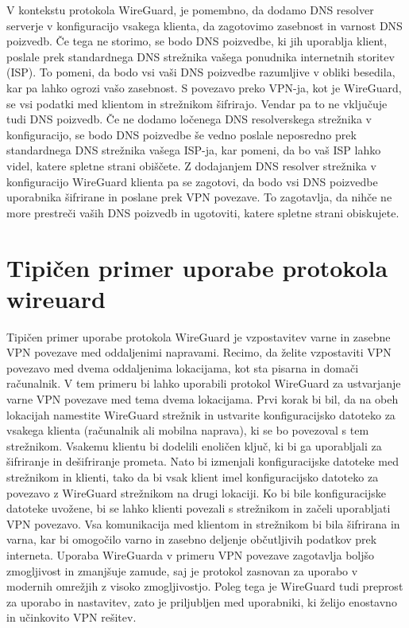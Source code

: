 \documentclass[a4paper, 11pt]{article}
\begin{document}
V kontekstu protokola WireGuard, je pomembno, da dodamo DNS resolver serverje v konfiguracijo vsakega klienta, da zagotovimo zasebnost in varnost DNS poizvedb.
Če tega ne storimo, se bodo DNS poizvedbe, ki jih uporablja klient, poslale prek standardnega DNS strežnika vašega ponudnika internetnih storitev (ISP). To pomeni,
da bodo vsi vaši DNS poizvedbe razumljive v obliki besedila, kar pa lahko ogrozi vašo zasebnost.
S povezavo preko VPN-ja, kot je WireGuard, se vsi podatki med klientom in strežnikom šifrirajo. 
Vendar pa to ne vključuje tudi DNS poizvedb. Če ne dodamo ločenega DNS resolverskega strežnika v konfiguracijo, se bodo DNS poizvedbe še vedno poslale neposredno prek 
standardnega DNS strežnika vašega ISP-ja, kar pomeni, da bo vaš ISP lahko videl, katere spletne strani obiščete.
Z dodajanjem DNS resolver strežnika v konfiguracijo WireGuard klienta pa se zagotovi, da bodo vsi DNS poizvedbe uporabnika šifrirane in poslane prek VPN povezave.
To zagotavlja, da nihče ne more prestreči vaših DNS poizvedb in ugotoviti, katere spletne strani obiskujete.
\pagebreak

\section{Tipičen primer uporabe protokola wireuard}
Tipičen primer uporabe protokola WireGuard je vzpostavitev varne in zasebne VPN povezave med oddaljenimi napravami.
Recimo, da želite vzpostaviti VPN povezavo med dvema oddaljenima lokacijama, kot sta pisarna in domači računalnik. 
V tem primeru bi lahko uporabili protokol WireGuard za ustvarjanje varne VPN povezave med tema dvema lokacijama.
Prvi korak bi bil, da na obeh lokacijah namestite WireGuard strežnik in ustvarite konfiguracijsko datoteko za vsakega 
klienta (računalnik ali mobilna naprava), ki se bo povezoval s tem strežnikom. Vsakemu klientu bi dodelili enoličen ključ, 
ki bi ga uporabljali za šifriranje in dešifriranje prometa. Nato bi izmenjali konfiguracijske datoteke med strežnikom in klienti,
tako da bi vsak klient imel konfiguracijsko datoteko za povezavo z WireGuard strežnikom na drugi lokaciji.
Ko bi bile konfiguracijske datoteke uvožene, bi se lahko klienti povezali s strežnikom in začeli uporabljati VPN povezavo.
Vsa komunikacija med klientom in strežnikom bi bila šifrirana in varna, kar bi omogočilo varno in zasebno deljenje občutljivih podatkov prek interneta.
Uporaba WireGuarda v primeru VPN povezave zagotavlja boljšo zmogljivost in zmanjšuje zamude, saj je protokol zasnovan za uporabo 
v modernih omrežjih z visoko zmogljivostjo. Poleg tega je WireGuard tudi preprost za uporabo in nastavitev, zato je priljubljen med uporabniki,
ki želijo enostavno in učinkovito VPN rešitev.
\pagebreak
\end{document}
